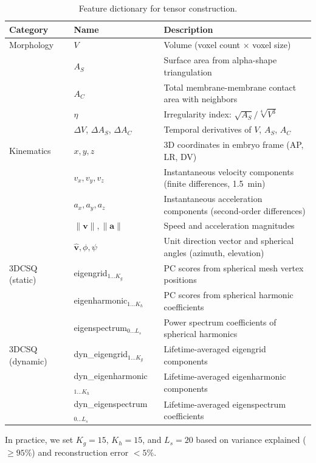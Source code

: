 \documentclass[unnumsec,webpdf,modern,large,namedate]{oup-authoring-template}%
\theoremstyle{thmstyleone}\newtheorem{theorem}{Theorem}
\theoremstyle{thmstyletwo}\newtheorem{example}{Example}
\theoremstyle{thmstylethree}\newtheorem{definition}{Definition}
\begin{document}
\begin{table}[t]
\centering
\caption{Feature dictionary for tensor construction.}
\label{tab:feature-dict}
\begin{tabular}{llp{8cm}}
\toprule
\textbf{Category} & \textbf{Name} & \textbf{Description} \\
\midrule
Morphology & $V$ & Volume (voxel count $\times$ voxel size) \\
 & $A_S$ & Surface area from alpha-shape triangulation \\
 & $A_C$ & Total membrane-membrane contact area with neighbors \\
 & $\eta$ & Irregularity index: $\sqrt{A_S}/\sqrt[4]{V^3}$ \\
 & $\Delta V$, $\Delta A_S$, $\Delta A_C$ & Temporal derivatives of $V$, $A_S$, $A_C$ \\
\midrule
Kinematics & $x,y,z$ & 3D coordinates in embryo frame (AP, LR, DV) \\
 & $v_x,v_y,v_z$ & Instantaneous velocity components (finite differences, 1.5~min) \\
 & $a_x,a_y,a_z$ & Instantaneous acceleration components (second-order differences) \\
 & $\|\mathbf v\|,\|\mathbf a\|$ & Speed and acceleration magnitudes \\
 & $\hat{\mathbf v},\phi,\psi$ & Unit direction vector and spherical angles (azimuth, elevation) \\
\midrule
3DCSQ (static) & eigengrid$_{1\ldots K_g}$ & PC scores from spherical mesh vertex positions \\
 & eigenharmonic$_{1\ldots K_h}$ & PC scores from spherical harmonic coefficients \\
 & eigenspectrum$_{0\ldots L_s}$ & Power spectrum coefficients of spherical harmonics \\
\midrule
3DCSQ (dynamic) & dyn\_eigengrid$_{1\ldots K_g}$ & Lifetime-averaged eigengrid components \\
 & dyn\_eigenharmonic$_{1\ldots K_h}$ & Lifetime-averaged eigenharmonic components \\
 & dyn\_eigenspectrum$_{0\ldots L_s}$ & Lifetime-averaged eigenspectrum coefficients \\
\bottomrule
\end{tabular}
\end{table}

In practice, we set $K_g = 15$, $K_h = 15$, and $L_s = 20$ based on variance explained ($\geq 95\%$) and reconstruction error $< 5\%$.
\end{document}
